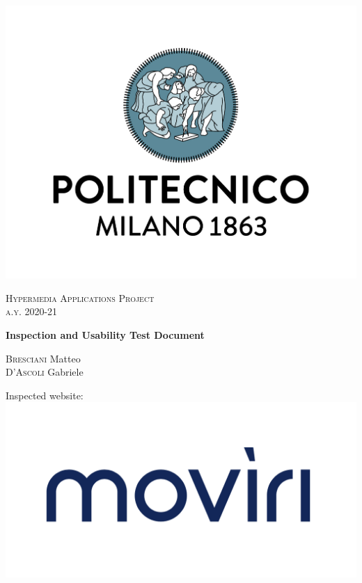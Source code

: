 \documentclass[fontsize=11pt,paper=a4,pagesize=auto]{report}
\begin{document}
\begin{titlepage}
	\centering
	\includegraphics[scale = 0.25]{images/polimi.jpg}\par
	
	{\scshape\Large
		Hypermedia Applications Project\\
		a.y. 2020-21\par}
			\vspace{0.5cm}
	{\huge\bfseries
		Inspection and Usability Test Document\\\par}

	\vspace{0.5cm}
	{\Large
		{\scshape Bresciani} Matteo\\
		{\scshape D'Ascoli}  Gabriele\par

		}
			\vspace{1cm}

		{\huge\Large
		Inspected website:}\\

		\includegraphics[scale = 0.30]{images/moviri-logo.png}\par
		
	
\end{titlepage}
\end{document}
